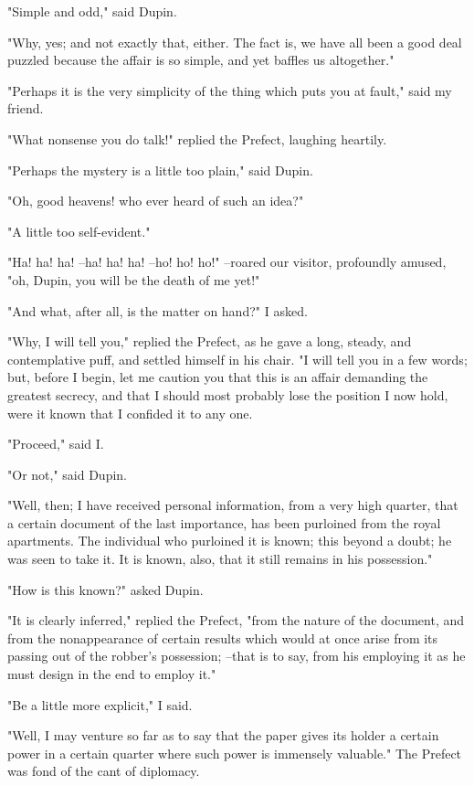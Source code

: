 \documentclass{article}
\begin{document}
"Simple and odd," said Dupin.

"Why, yes; and not exactly that, either. The fact is, we have all been a good deal puzzled because the affair is so simple, and yet baffles us altogether."

"Perhaps it is the very simplicity of the thing which puts you at fault," said my friend.

"What nonsense you do talk!" replied the Prefect, laughing heartily.

"Perhaps the mystery is a little too plain," said Dupin.

"Oh, good heavens! who ever heard of such an idea?"

"A little too self-evident."

"Ha! ha! ha! --ha! ha! ha! --ho! ho! ho!" --roared our visitor, profoundly amused, "oh, Dupin, you will be the death of me yet!"

"And what, after all, is the matter on hand?" I asked.

"Why, I will tell you," replied the Prefect, as he gave a long, steady, and contemplative puff, and settled himself in his chair. "I will tell you in a few words; but, before I begin, let me caution you that this is an affair demanding the greatest secrecy, and that I should most probably lose the position I now hold, were it known that I confided it to any one.

"Proceed," said I.

"Or not," said Dupin.

"Well, then; I have received personal information, from a very high quarter, that a certain document of the last importance, has been purloined from the royal apartments. The individual who purloined it is known; this beyond a doubt; he was seen to take it. It is known, also, that it still remains in his possession."

"How is this known?" asked Dupin.

"It is clearly inferred," replied the Prefect, "from the nature of the document, and from the nonappearance of certain results which would at once arise from its passing out of the robber's possession; --that is to say, from his employing it as he must design in the end to employ it."

"Be a little more explicit," I said.

"Well, I may venture so far as to say that the paper gives its holder a certain power in a certain quarter where such power is immensely valuable." The Prefect was fond of the cant of diplomacy.
\end{document}
